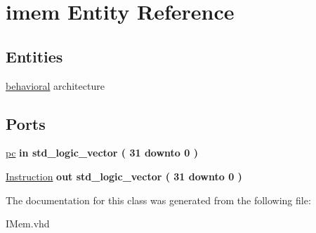 \hypertarget{classimem}{\section{imem \-Entity \-Reference}
\label{classimem}
}
\subsection*{\-Entities}
\begin{DoxyCompactItemize}
\item 
\hyperlink{classimem_1_1behavioral}{behavioral} architecture
\end{DoxyCompactItemize}
\*
\*
\subsection*{\-Ports}
 \begin{DoxyCompactItemize}
\item 
\hypertarget{classimem_ad1a221c09af97e0f0a04247472ab8016}{\hyperlink{classimem_ad1a221c09af97e0f0a04247472ab8016}{pc}  {\bfseries {\bfseries in }} {\bfseries std\-\_\-logic\-\_\-vector (   31    downto    0  ) } }\label{classimem_ad1a221c09af97e0f0a04247472ab8016}

\item 
\hypertarget{classimem_ac89b0bccd70cd43f4ea4ae5521cf8052}{\hyperlink{classimem_ac89b0bccd70cd43f4ea4ae5521cf8052}{\-Instruction}  {\bfseries {\bfseries out }} {\bfseries std\-\_\-logic\-\_\-vector (   31    downto    0  ) } }\label{classimem_ac89b0bccd70cd43f4ea4ae5521cf8052}

\end{DoxyCompactItemize}


\-The documentation for this class was generated from the following file\-:\begin{DoxyCompactItemize}
\item 
\-I\-Mem.\-vhd\end{DoxyCompactItemize}
